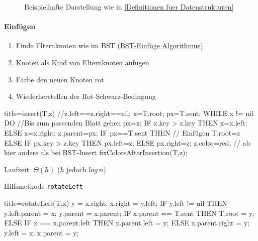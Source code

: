 \documentclass[
    ngerman,
    color=3b,
    dark_mode,
    load_common, %
    summary,
    boxarc,
]{rubos-tuda-template}
\begin{document}
\begin{figure}[ht]
    \centering
    \caption{Beispielhafte Darstellung wie in \ref{Definitionen fuer Datenstrukturen}}
    \label{fig:red_black_tree_example}
\end{figure}
\clearpage
\paragraph{Einfügen}
\begin{enumerate}
    \item Finde Elternknoten wie im BST (\hyperref[BST-Insert]{BST-Einfüge Algorithmus})
    \item Knoten als Kind von Elternknoten anfügen
    \item Färbe den neuen Knoten rot
    \item Wiederherstellen der Rot-Schwarz-Bedingung
\end{enumerate}
\begin{codeBlock}[autogobble,escapeinside=||]{title={insert(T,z) //z.left==z.right==nil;}}
    x=T.root; px=T.sent;
    WHILE x != nil DO                   //Bis zum passenden Blatt gehen
        px=x;
        IF x.key > z.key THEN
            x=x.left;
        ELSE
            x=x.right;
    z.parent=px;
    IF px==T.sent THEN                  // Einfügen
        T.root=z
    ELSE
        IF px.key > z.key THEN
            px.left=z;
        ELSE
            px.right=z;
    z.color=red;                        // ab hier anders als bei BST-Insert
    fixColorsAfterInsertion(T,z);
\end{codeBlock} 
Laufzeit: $\Theta(h)$ ($h$ jedoch $log~n$)

Hilfsmethode \texttt{rotateLeft}
\begin{codeBlock}[autogobble]{title={rotateLeft(T,x)}}
    y = x.right;
    x.right = y.left;
    IF y.left != nil THEN
        y.left.parent = x;
    y.parent = x.parent;
    IF x.parent == T.sent THEN
        T.root = y;
    ELSE
        IF x == x.parent.left THEN
            x.parent.left = y;
        ELSE
            x.parent.right = y;
    y.left = x;
    x.parent = y;
\end{codeBlock}
\clearpage
\end{document}
